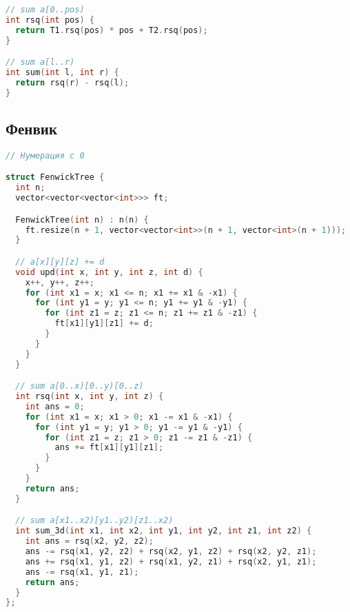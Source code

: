 \documentclass[10pt,a4paper,landscape,twosided]{extarticle}
\begin{document}
\begin{multicols*}{3}
\begin{lstlisting}[language=C++]
// sum a[0..pos)
int rsq(int pos) {
  return T1.rsq(pos) * pos + T2.rsq(pos);
}

// sum a[l..r)
int sum(int l, int r) {
  return rsq(r) - rsq(l);
}

\end{lstlisting}

\subsection{Фенвик}
\begin{lstlisting}[language=C++]
// Нумерация с 0

struct FenwickTree {
  int n;
  vector<vector<vector<int>>> ft;

  FenwickTree(int n) : n(n) {
    ft.resize(n + 1, vector<vector<int>>(n + 1, vector<int>(n + 1)));
  }

  // a[x][y][z] += d
  void upd(int x, int y, int z, int d) {
    x++, y++, z++;
    for (int x1 = x; x1 <= n; x1 += x1 & -x1) {
      for (int y1 = y; y1 <= n; y1 += y1 & -y1) {
        for (int z1 = z; z1 <= n; z1 += z1 & -z1) {
          ft[x1][y1][z1] += d;
        }
      }
    }
  }

  // sum a[0..x)[0..y)[0..z)
  int rsq(int x, int y, int z) {
    int ans = 0;
    for (int x1 = x; x1 > 0; x1 -= x1 & -x1) {
      for (int y1 = y; y1 > 0; y1 -= y1 & -y1) {
        for (int z1 = z; z1 > 0; z1 -= z1 & -z1) {
          ans += ft[x1][y1][z1];
        }
      }
    }
    return ans;
  }

  // sum a[x1..x2)[y1..y2)[z1..x2)
  int sum_3d(int x1, int x2, int y1, int y2, int z1, int z2) {
    int ans = rsq(x2, y2, z2);
    ans -= rsq(x1, y2, z2) + rsq(x2, y1, z2) + rsq(x2, y2, z1);
    ans += rsq(x1, y1, z2) + rsq(x1, y2, z1) + rsq(x2, y1, z1);
    ans -= rsq(x1, y1, z1);
    return ans;
  }
};
\end{lstlisting}


\end{multicols*}
\end{document}
